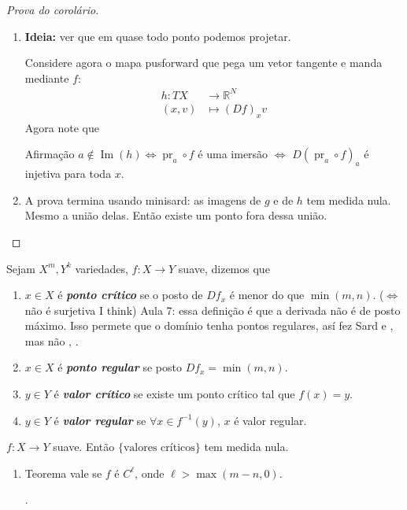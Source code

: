 \begin{proof}[Prova do corolário]
\begin{enumerate}[label=\textbf{Step \arabic*}]
\item \textbf{Ideia:} ver que em quase todo ponto podemos projetar.

Considere agora o mapa pusforward que pega um vetor tangente e manda mediante $f$:
\begin{align*}
	h: TX &\longrightarrow \mathbb{R}^N \\
	(x,v) &\longmapsto (Df)_xv
\end{align*}
Agora note que
\begin{thing4}{Afirmação}\leavevmode
\(a \not\in \operatorname{Im}(h) \iff \operatorname{pr}_a \circ f\) é uma imersão \(\iff\) \(D(\operatorname{pr}_a \circ f)_a\) é injetiva para toda $x$.
\end{thing4}

\item A prova termina usando minisard: as imagens de $g$ e de \(h\) tem medida nula. Mesmo a união delas. Então existe um ponto fora dessa união.
\end{enumerate}
\end{proof}

\begin{defn}\leavevmode
Sejam \(X^m, Y^k\) variedades, \(f:X \to Y\) suave, dizemos que
\begin{enumerate}[label=(\alph*)]
	\item \(x \in X\) é \textit{\textbf{ponto crítico}} se o posto de \(Df_x\) é menor do que \(\operatorname{min}(m,n)\). (\(\iff\)não é surjetiva I think) {\color{6}Aula 7: essa definição é que a derivada não é de posto máximo. Isso permete que o domínio tenha pontos regulares, así fez Sard e  \cite{gui2}, mas não \cite{lee}, \cite{gui}.}
\item \(x \in X\) é \textit{\textbf{ponto regular}} se posto \(Df_x=\operatorname{min}(m,n)\).
\item \(y \in Y\) é \textit{\textbf{valor crítico}} se existe um ponto crítico tal que \(f(x) = y\).
\item \(y \in Y\) é \textit{\textbf{valor regular}} se \(\forall x \in f^{-1}(y)\), \(x\) é valor regular.
\end{enumerate}
\end{defn}

\begin{thm}[Sard]\leavevmode
\(f:X \to Y\) suave. Então \(\{\text{valores críticos} \}\) tem medida nula.
\end{thm}

\begin{remark}\leavevmode
\begin{enumerate}
\item Teorema vale se \(f\) é \(C^\ell\), onde \(\ell>\operatorname{max}(m-n,0)\). 

	. \end{enumerate}
\end{remark}

